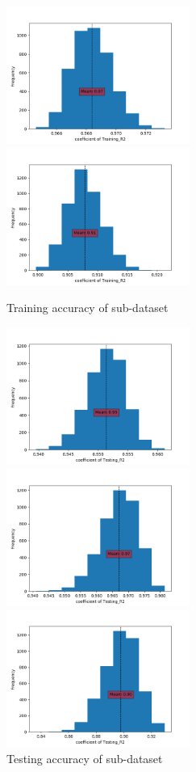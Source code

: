 \documentclass[preprint,12pt]{elsarticle}
\begin{document}
\begin{figure}[H]
\begin{multicols}{3}
				    		\includegraphics[width=6cm]{TrainingR21.png}\par 
				    		\includegraphics[width=6cm]{TrainingR22.png}\par 
				    	\end{multicols}		
				    	\caption{Training accuracy  of sub-dataset}	   		  
				    	\begin{multicols}{3}
				    		\includegraphics[width=6cm]{TestingR20.png}\par 
				    		\includegraphics[width=6cm]{TestingR21.png}\par 
				    		\includegraphics[width=6cm]{TestingR22.png}\par 
				    	\end{multicols}	
				    	\caption{Testing accuracy  of sub-dataset}	
				    	
				    \end{figure}
				    
\end{document}
